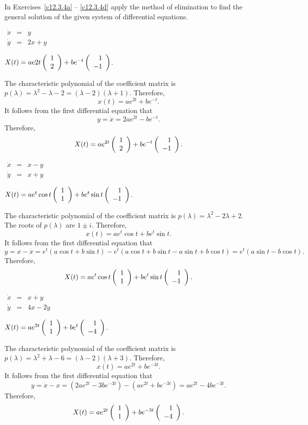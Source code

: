 \documentclass{ximera}
\begin{document}
\noindent In Exercises~\ref{c12.3.4a} -- \ref{c12.3.4d} apply the
method of elimination to find the general solution of the given
system of differential equations.
\begin{exercise} \label{c12.3.4a}
$\begin{array}{rcl}
\dot{x} & = & y\\
\dot{y} & = & 2x+y
\end{array}$

\begin{solution}
\ans $X(t) = ae{2t}\left(\begin{array}{r} 1 \\ 2\end{array}\right) + be^{-t}\left(\begin{array}{r} 1 \\ -1\end{array}\right)$.

\soln  The characteristic polynomial of the coefficient matrix is 
$p(\lambda) = \lambda^2-\lambda-2=(\lambda-2)(\lambda+1)$.  Therefore, 
\[
x(t) = ae^{2t}+be^{-t}.
\]
It follows from the first differential equation that 
\[
y = \dot{x} = 2ae^{2t}-be^{-t}.
\]
Therefore,
\[
X(t) = ae^{2t}\left(\begin{array}{r} 1 \\ 2\end{array}\right) + be^{-t}\left(\begin{array}{r} 1 \\ -1\end{array}\right).
\]


\end{solution}
\end{exercise}
\begin{exercise} \label{c12.3.4b}
$\begin{array}{rcl}
\dot{x} & = & x-y\\
\dot{y} & = & x+y
\end{array}$

\begin{solution}
\ans $X(t) = ae^t\cos t\left(\begin{array}{r} 1 \\ 1\end{array}\right) + be^t\sin t\left(\begin{array}{r} 1 \\ -1\end{array}\right)$.

\soln  The characteristic polynomial of the coefficient matrix is 
$p(\lambda) = \lambda^2-2\lambda+2$.  The roots of $p(\lambda)$ are $1\pm i$. 
Therefore, 
\[
x(t) = ae^t\cos t+be^t\sin t.
\]
It follows from the first differential equation that 
\[
y = x-\dot{x} = e^t(a\cos t+b\sin t) - e^t(a\cos t+b\sin t-a\sin t+b\cos t)
=e^t(a\sin t-b\cos t).
\]
Therefore,
\[
X(t) = ae^t\cos t\left(\begin{array}{r} 1 \\ 1\end{array}\right) + be^t\sin t\left(\begin{array}{r} 1 \\ -1\end{array}\right).
\]


\end{solution}
\end{exercise}
\begin{exercise} \label{c12.3.4c}
$\begin{array}{rcl}
\dot{x} & = & x+y\\
\dot{y} & = & 4x-2y
\end{array}$

\begin{solution}
\ans $X(t) = ae^{2t}\left(\begin{array}{r} 1 \\ 1\end{array}\right) + be^t\left(\begin{array}{r} 1 \\ -4\end{array}\right)$.

\soln  The characteristic polynomial of the coefficient matrix is 
$p(\lambda) = \lambda^2+\lambda-6=(\lambda-2)(\lambda+3)$.  Therefore, 
\[
x(t) = ae^{2t}+be^{-3t}.
\]
It follows from the first differential equation that 
\[
y =\dot{x}-x = (2ae^{2t}-3be^{-3t})-(ae^{2t}+be^{-3t}) = ae^{2t}-4be^{-3t}.
\]
Therefore,
\[
X(t) = ae^{2t}\left(\begin{array}{r} 1 \\ 1\end{array}\right) + be^{-3t}\left(\begin{array}{r} 1 \\ -4\end{array}\right).
\]


\end{solution}
\end{exercise}
\end{document}

